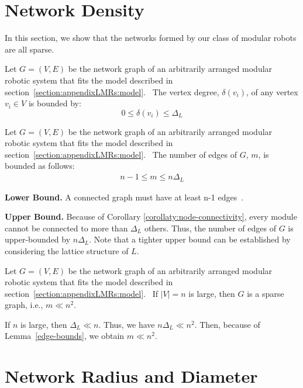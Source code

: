 \newcommand{\assumptions}{Let $G = (V,E)$ be the network graph of an arbitrarily arranged modular robotic system that fits the model described in section~\ref{section:appendixLMRs:model}.\ }

\section{Network Density}
\label{section:appendixLMRs:density}

In this section, we show that the networks formed by our class of modular robots are all sparse.

\begin{cor}
	\label{corollaty:node-connectivity}
	\assumptions{} The vertex degree, $\delta(v_i)$, of any vertex $v_i \in V$ is bounded by:
	\begin{equation}
	0 \leq \delta(v_i) \leq \Delta_L
	\end{equation}
\end{cor}

\begin{lem}
	\label{edge-bounds}
	\assumptions{} The number of edges of $G$, $m$, is bounded as follows:
	\begin{align}
	n-1 \leq m \leq n\Delta_L 
	\end{align}
\end{lem}

\begin{pf}
	\textbf{Lower Bound.} A connected graph must have at least n-1 edges~\cite{hayes2000graph}.
	
	\noindent\textbf{Upper Bound.} Because of Corollary \ref{corollaty:node-connectivity}, every module cannot be connected to more than $\Delta_L$ others. Thus, the number of edges of $G$ is upper-bounded by $n\Delta_L$. Note that a tighter upper bound can be established by considering the lattice structure of $L$.
\end{pf}

\begin{thm}
	\assumptions{}  If $|V| = n$ is large, then $G$ is a sparse graph, i.e., $m \ll n^2$.	
\end{thm}

\begin{pf}
	If $n$ is large, then $\Delta_L \ll n$. Thus, we have $n \Delta_L \ll n^2$. Then, because of Lemma~\ref{edge-bounds},  we obtain $m \ll n^2$.
\end{pf}

\section{Network Radius and Diameter}
\label{section:appendixLMRs:diameter}


